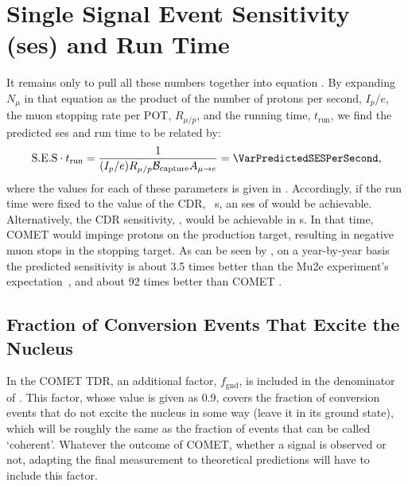 \section{Single Signal Event Sensitivity (\acs{ses}) and Run Time}
\TabSensParams
It remains only to pull all these numbers together into equation .
By expanding $N_\mu$ in that equation as the product of the number of protons per second, $I_p/e$, the muon stopping rate per \ac{POT}, $R_{\mu/p}$, and the running time, $t_\textrm{run}$, we find the predicted \ac{ses} and run time to be related by:
\begin{align}
	\eqlabel{sense:runtime}
	\mathrm{S.E.S}\cdot{}t_\textrm{run}=\frac{1}{(I_p/e){R}_{\mu/p}\mathcal{B}_\mathrm{capture} A_{\mu\rightarrow e}}=\VarPredictedSESPerSecond,
\end{align}
where the values for each of these parameters is given in .  
Accordingly, if the run time were fixed to the value of the CDR, \VarCDRRunTime[2]~s, an \ac{ses} of \VarPredictedSESCDRRunTime would be achievable.
Alternatively, the CDR sensitivity, \VarPredictedSES, would be achievable in \VarRunTime[2]s.  
In that time, COMET \phaseII would impinge \VarTotalPOT protons on the production target, resulting in \VarTotalMuStops negative muon stops in the stopping target.
As can be seen by , on a year-by-year basis the predicted \phaseII sensitivity is about 3.5 times better than the Mu2e experiment's expectation~\cite{Mu2e2014}, and about 92 times better than COMET \phaseI.
\TabSensEstimates

\subsection{Fraction of Conversion Events That Excite the Nucleus}
In the COMET \phaseI TDR, an additional factor, $f_\textrm{gnd}$, is included in the denominator of .
This factor, whose value is given as 0.9, covers the fraction of conversion events that do not excite the nucleus in some way (\ie leave it in its ground state), which will be roughly the same as the fraction of events that can be called `coherent'.
Whatever the outcome of COMET, whether a signal is observed or not, adapting the final measurement to theoretical predictions will have to include this factor.

